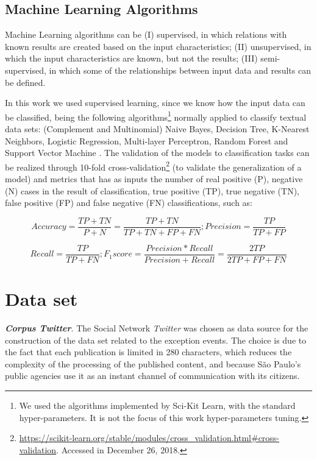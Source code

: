 \documentclass[runningheads]{llncs}
\begin{document}
\subsection {Machine Learning Algorithms}
\label{machinelearning}
Machine Learning algorithms can be (I) supervised, in which relations with known results are created based on the input characteristics; (II) unsupervised, in which the input characteristics are known, but not the results; (III) semi-supervised, in which some of the relationships between input data and results can be defined.

In this work we used supervised learning, since we know how the input data can be classified, being the following algorithms\footnote{We used the algorithms implemented by Sci-Kit Learn, with the standard hyper-parameters. It is not the focus of this work hyper-parameters tuning.} normally applied to classify textual data sets: (Complement and Multinomial) Naive Bayes, Decision Tree, K-Nearest Neighbors, Logistic Regression, Multi-layer Perceptron, Random Forest and Support Vector Machine \cite{kotsiantis2007supervised, dwivedi2016automatic, narayanan2017survey}. The validation of the models to classification tasks can be realized through 10-fold cross-validation\footnote{\url{https://scikit-learn.org/stable/modules/cross_validation.html\#cross-validation}. Accessed in December 26, 2018.} (to validate the generalization of a model) and metrics that has as inputs the number of real positive (P), negative (N) cases in the result of classification, true positive (TP), true negative (TN), false positive (FP) and false negative (FN) classifications, such as:

\noindent
\begin{equation*}
Accuracy = \frac{TP + TN}{P + N} = \frac{TP + TN}{TP + TN + FP + FN}; Precision = \frac{TP}{TP + FP}
\end{equation*}

\noindent
\begin{equation*}
Recall = \frac{TP}{TP + FN}; F_1 score = \frac{Precision * Recall}{Precision + Recall} = \frac{2TP}{2TP + FP + FN}
\end{equation*}

\section{Data set}
\label{dataSet}

\textbf{\textit{Corpus Twitter}}. The Social Network \textit{Twitter} was chosen as data source for the construction of the data set related to the exception events. The choice is due to the fact that each publication is limited in 280 characters, which reduces the complexity of the processing of the published content, and because São Paulo's public agencies use it as an instant channel of communication with its citizens.
\end{document}
